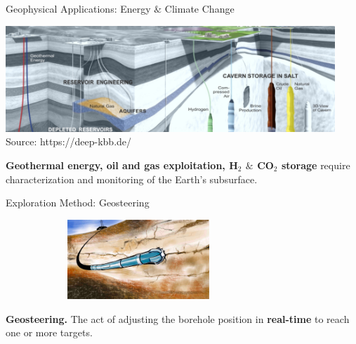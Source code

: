 \begin{frame}{Geophysical Applications: Energy  $\&$ Climate Change}

\vspace{-0.2cm}
\center\includegraphics[height=4cm]{Diapos/Intro/Figures/Room_for_energy} \hspace*{0.2cm}\\
\vspace{-0.35cm}
\center\scriptsize{Source: https://deep-kbb.de/}

\vspace{1cm}
\raggedright\normalsize{\textbf{Geothermal energy, oil and gas exploitation, H$_2$  $\&$ CO$_2$ storage} require characterization and monitoring of the Earth's subsurface.}
\end{frame} 


\begin{frame}{Exploration Method: Geosteering}

\vspace{0.1cm}
\center\includegraphics[height=3cm, width=10cm]{Diapos/Intro/Figures/Geosteering_drawing} \hspace*{0.2cm}\\

\vspace{0.4cm}
\raggedright\normalsize{\textbf{Geosteering.} The act of adjusting the borehole position in \textbf{real-time} to reach one or more targets.}

\end{frame} 
